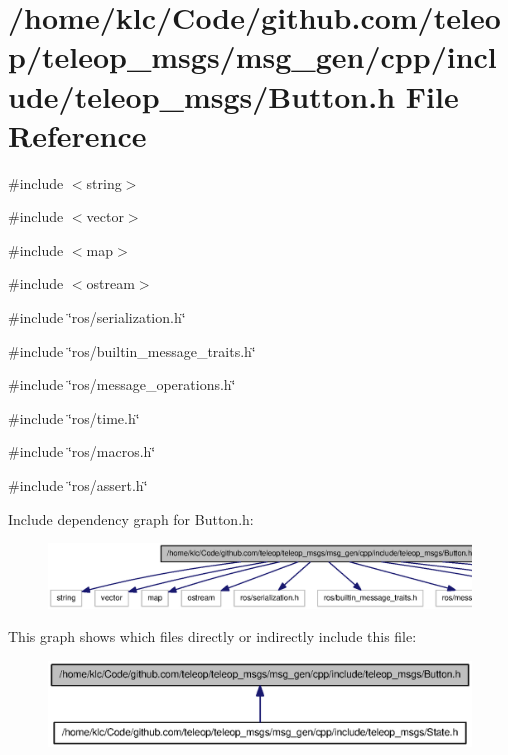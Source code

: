 \section{/home/klc/Code/github.com/teleop/teleop\_\-msgs/msg\_\-gen/cpp/include/teleop\_\-msgs/Button.h File Reference}
\label{Button_8h}
{\ttfamily \#include $<$string$>$}\par
{\ttfamily \#include $<$vector$>$}\par
{\ttfamily \#include $<$map$>$}\par
{\ttfamily \#include $<$ostream$>$}\par
{\ttfamily \#include \char`\"{}ros/serialization.h\char`\"{}}\par
{\ttfamily \#include \char`\"{}ros/builtin\_\-message\_\-traits.h\char`\"{}}\par
{\ttfamily \#include \char`\"{}ros/message\_\-operations.h\char`\"{}}\par
{\ttfamily \#include \char`\"{}ros/time.h\char`\"{}}\par
{\ttfamily \#include \char`\"{}ros/macros.h\char`\"{}}\par
{\ttfamily \#include \char`\"{}ros/assert.h\char`\"{}}\par
Include dependency graph for Button.h:
\nopagebreak
\begin{figure}[H]
\begin{center}
\leavevmode
\includegraphics[width=400pt]{Button_8h__incl}
\end{center}
\end{figure}
This graph shows which files directly or indirectly include this file:
\nopagebreak
\begin{figure}[H]
\begin{center}
\leavevmode
\includegraphics[width=400pt]{Button_8h__dep__incl}
\end{center}
\end{figure}
